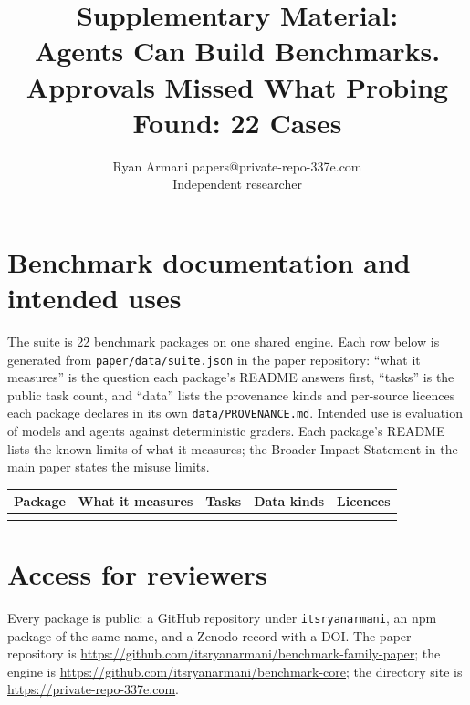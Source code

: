 \documentclass[twoside,11pt]{article}
\begin{document}
\title{Supplementary Material:\\Agents Can Build Benchmarks. Approvals Missed What Probing Found: 22 Cases}
\author{\name Ryan Armani \email papers@private-repo-337e.com \\
       \addr Independent researcher}

\maketitle

\section{Benchmark documentation and intended uses}
The suite is 22 benchmark packages on one shared engine. Each row below
is generated from \texttt{paper/data/suite.json} in the paper repository:
``what it measures'' is the question each package's README answers first,
``tasks'' is the public task count, and ``data'' lists the provenance
kinds and per-source licences each package declares in its own
\texttt{data/PROVENANCE.md}. Intended use is evaluation of models and
agents against deterministic graders. Each package's README lists the known
limits of what it measures; the Broader Impact Statement in the main paper
states the misuse limits.

\begin{center}\small
\setlength{\tabcolsep}{4pt}
\begin{longtable}{@{}>{\raggedright\arraybackslash}p{}>{\raggedright\arraybackslash}p{}>{\raggedright\arraybackslash}p{}>{\raggedright\arraybackslash}p{}>{\raggedright\arraybackslash}p{}@{}}
\toprule
Package & What it measures & Tasks & Data kinds & Licences \\
\midrule
\endhead
\bottomrule
\endfoot

\end{longtable}
\end{center}

\section{Access for reviewers}
Every package is public: a GitHub repository under \texttt{itsryanarmani},
an npm package of the same name, and a Zenodo record with a DOI. The
paper repository is
\url{https://github.com/itsryanarmani/benchmark-family-paper}; the engine is
\url{https://github.com/itsryanarmani/benchmark-core}; the directory site is
\url{https://private-repo-337e.com}.
\end{document}
